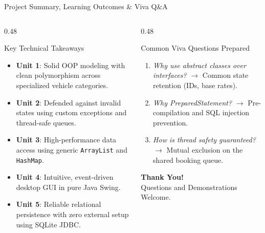 \documentclass[aspectratio=169,10pt]{beamer}
\begin{document}
\begin{frame}{Project Summary, Learning Outcomes \& Viva Q\&A}
    \begin{columns}[T]
        \begin{column}{0.48\textwidth}
            \begin{block}{Key Technical Takeaways}
                \small
                \begin{itemize}
                    \item \textbf{Unit 1}: Solid OOP modeling with clean polymorphism across specialized vehicle categories.
                    \item \textbf{Unit 2}: Defended against invalid states using custom exceptions and thread-safe queues.
                    \item \textbf{Unit 3}: High-performance data access using generic \texttt{ArrayList} and \texttt{HashMap}.
                    \item \textbf{Unit 4}: Intuitive, event-driven desktop GUI in pure Java Swing.
                    \item \textbf{Unit 5}: Reliable relational persistence with zero external setup using SQLite JDBC.
                \end{itemize}
            \end{block}
        \end{column}
        
        \begin{column}{0.48\textwidth}
            \begin{exampleblock}{Common Viva Questions Prepared}
                \small
                \begin{enumerate}
                    \item \textit{Why use abstract classes over interfaces?} $\rightarrow$ Common state retention (IDs, base rates).
                    \item \textit{Why PreparedStatement?} $\rightarrow$ Pre-compilation and SQL injection prevention.
                    \item \textit{How is thread safety guaranteed?} $\rightarrow$ Mutual exclusion on the shared booking queue.
                \end{enumerate}
            \end{exampleblock}
            
            \vspace{0.4cm}
            \centering
            \textbf{\Large Thank You!}\\
            \small Questions and Demonstrations Welcome.
        \end{column}
    \end{columns}
\end{frame}
\end{document}
